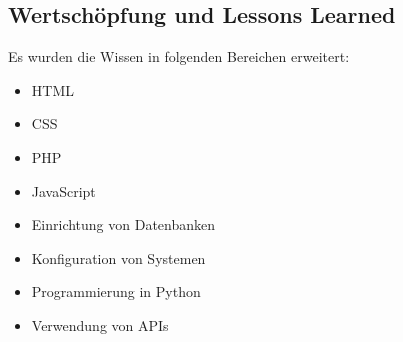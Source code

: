 \subsection{Wertschöpfung und Lessons Learned}
Es wurden die Wissen in folgenden Bereichen erweitert: \\
\begin{itemize}
	\item HTML
\end{itemize}
\begin{itemize}
	\item CSS
\end{itemize}
\begin{itemize}
	\item PHP
\end{itemize}
\begin{itemize}
	\item JavaScript
\end{itemize}
\begin{itemize}
	\item Einrichtung von Datenbanken
\end{itemize}
\begin{itemize}
	\item Konfiguration von Systemen
\end{itemize} 
\begin{itemize}
	\item Programmierung in Python
\end{itemize}
 \begin{itemize}
 	\item Verwendung von APIs
 \end{itemize}

\label{\docname}

